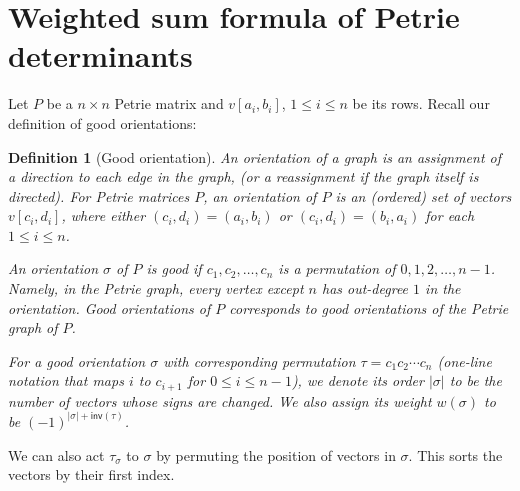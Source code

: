 \documentclass[pdflatex,sn-mathphys-num]{sn-jnl}%
\theoremstyle{thmstyleone}%
\theoremstyle{thmstyletwo}%
\theoremstyle{thmstylethree}%
\newtheorem{definition}[theorem]{Definition}
\numberwithin{equation}{section}
\newcommand{\inv}{\mathsf{inv}}
\begin{document}
\section{Weighted sum formula of Petrie determinants }\label{sec:WeightSum}
    
    Let $P$ be a $n\times n$ Petrie matrix and $v[a_i,b_i]$, $1\leq i\leq n$ be its rows. Recall our definition of good orientations:

    \begin{definition}[Good orientation]
        An \emph{orientation} of a graph is an assignment of a direction to each edge in the graph, (or a reassignment if the graph itself is directed). For Petrie matrices $P$, an \textit{orientation} of $P$ is an (ordered) set of vectors $v[c_i,d_i]$, where either $(c_i,d_i)=(a_i,b_i)$ or $(c_i,d_i)=(b_i,a_i)$ for each $1\leq i\leq n$.

        An orientation $\sigma$ of $P$ is \emph{good} if $c_1,c_2,\dotsc,c_n$ is a permutation of $0,1,2,\dotsc,n-1$. Namely, in the Petrie graph, every vertex except $n$ has out-degree $1$ in the orientation. Good orientations of $P$ corresponds to good orientations of the Petrie graph of $P$.

        For a good orientation $\sigma$ with corresponding permutation $\tau=c_1c_2\cdots c_{n}$ (one-line notation that maps $i$ to $c_{i+1}$ for $0\leq i\leq n-1$), we denote its \emph{order} $|\sigma|$ to be the number of vectors whose signs are changed. We also assign its \emph{weight} $w(\sigma)$ to be $(-1)^{|\sigma|+\inv(\tau)}$.

    \end{definition}
        We can also act $\tau_\sigma$ to $\sigma$ by permuting the position of vectors in $\sigma$. This sorts the vectors by their first index.
    
\end{document}
